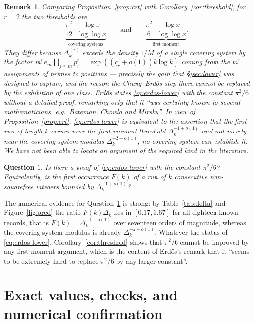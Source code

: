 \documentclass[10pt,a4paper]{amsart}
\newtheorem{question}[theorem]{Question}
\newtheorem{remark}[theorem]{Remark}
\numberwithin{equation}{section}
\begin{document}
\begin{remark}\label{rem:status}
Comparing Proposition~\ref{prop:crt} with Corollary~\ref{cor:threshold}, for $r=2$ the two
thresholds are
\[
  \underbrace{\frac{\pi^{2}}{12}\cdot\frac{\log x}{\log\log x}}_{\text{covering systems}}
  \qquad\text{and}\qquad
  \underbrace{\frac{\pi^{2}}{6}\cdot\frac{\log x}{\log\log x}}_{\text{first moment}} .
\]
They differ because $\Delta^{(r)}_k$ exceeds the density $1/M$ of a single covering system
by the factor $m!\,e_m\prod_{j\le m}p_j^{r}=\exp((q_r+o(1))k\log k)$ coming from the $m!$
assignments of primes to positions --- precisely the gain that \S\ref{sec:lower} was
designed to capture, and the reason the Chung--Erd\H{o}s step there cannot be replaced by
the exhibition of one class. Erd\H{o}s states \eqref{eq:erdos-lower} with the constant
$\pi^{2}/6$ without a detailed proof, remarking only that it ``was certainly known to
several mathematicians, e.g.\ Bateman, Chowla and Mirsky''. In view of
Proposition~\ref{prop:crt}, \eqref{eq:erdos-lower} is \emph{equivalent} to the assertion
that the first run of length $k$ occurs near the first-moment threshold
$\Delta_k^{-1+o(1)}$ and not merely near the covering-system modulus
$\Delta_k^{-2+o(1)}$; no covering system can establish it. We have not been able to locate
an argument of the required kind in the literature.
\end{remark}

\begin{question}\label{q:erdos20}
Is there a proof of \eqref{eq:erdos-lower} with the constant $\pi^{2}/6$? Equivalently, is
the first occurrence $F(k)$ of a run of $k$ consecutive non-squarefree integers bounded by
$\Delta_k^{-1+o(1)}$?
\end{question}

The numerical evidence for Question~\ref{q:erdos20} is strong: by Table~\ref{tab:delta} and
Figure~\ref{fig:pred} the ratio $F(k)\Delta_k$ lies in $[0.17,3.67]$ for all eighteen known
records, that is $F(k)=\Delta_k^{-1+o(1)}$ over seventeen orders of magnitude, whereas the
covering-system modulus is already $\Delta_k^{-2+o(1)}$. Whatever the status of
\eqref{eq:erdos-lower}, Corollary~\ref{cor:threshold} shows that $\pi^{2}/6$ cannot be
improved by any first-moment argument, which is the content of Erd\H{o}s's remark that it
``seems to be extremely hard to replace $\pi^{2}/6$ by any larger constant''.

\section{Exact values, checks, and numerical confirmation}
\label{sec:numerics}
\end{document}
